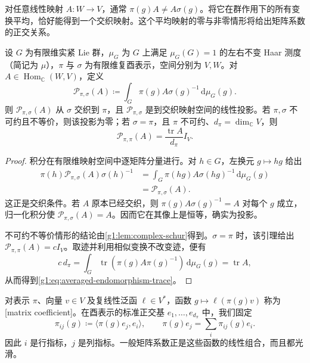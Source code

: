 \ProseParagraphBreak

对任意线性映射 \(A:W\to V\)，通常 \(\pi(g)A\ne A\sigma(g)\)。将它在群作用下的所有变换平均，恰好能得到一个交织映射。这个平均映射的零与非零情形将给出矩阵系数的正交关系。

\begin{proposition}\label{g1:prop:averaged-intertwiner}
	设 \(G\) 为有限维实紧 Lie 群，\(\mu_G\) 为 \(G\) 上满足 \(\mu_G(G)=1\) 的左右不变 Haar 测度（简记为 \(\mu\)），\(\pi\) 与 \(\sigma\) 为有限维复酉表示，空间分别为 \(V,W\)。对 \(A\in\operatorname{Hom}_{\mathbb C}(W,V)\)，定义
	\[
		\mathcal P_{\pi,\sigma}(A)
		\coloneqq\int_G\pi(g)A\sigma(g)^{-1}\,\mathrm{d}\mu_G(g).
	\]
	则 \(\mathcal P_{\pi,\sigma}(A)\) 从 \(\sigma\) 交织到 \(\pi\)，且 \(\mathcal P_{\pi,\sigma}\) 是到交织映射空间的线性投影。若 \(\pi,\sigma\) 不可约且不等价，则该投影为零；若 \(\sigma=\pi\)，且 \(\pi\) 不可约、\(d_\pi=\dim_{\mathbb C}V\)，则
	\begin{equation}\label{g1:eq:averaged-endomorphism-trace}
		\mathcal P_{\pi,\pi}(A)=\frac{\operatorname{tr}A}{d_\pi}I_V.
	\end{equation}
\end{proposition}
\begin{proof}
	积分在有限维映射空间中逐矩阵分量进行。对 \(h\in G\)，左换元 \(g\mapsto hg\) 给出
	\[
		\begin{aligned}
			\pi(h)\mathcal P_{\pi,\sigma}(A)\sigma(h)^{-1}
			&=\int_G\pi(hg)A\sigma(hg)^{-1}\,\mathrm{d}\mu_G(g)\\
			&=\mathcal P_{\pi,\sigma}(A).
		\end{aligned}
	\]
	这正是交织条件。若 \(A\) 原本已经交织，则 \(\pi(g)A\sigma(g)^{-1}=A\) 对每个 \(g\) 成立，归一化积分使 \(\mathcal P_{\pi,\sigma}(A)=A\)。因而它在其像上是恒等，确实为投影。

	不可约不等价情形的结论由\cref{g1:lem:complex-schur}得到。\(\sigma=\pi\) 时，该引理给出 \(\mathcal P_{\pi,\pi}(A)=cI_V\)。取迹并利用相似变换不改变迹，便有
	\[
		c\,d_\pi=\int_G\operatorname{tr}(\pi(g)A\pi(g)^{-1})\,\mathrm{d}\mu_G(g)
		=\operatorname{tr}A,
	\]
	从而得到\eqref{g1:eq:averaged-endomorphism-trace}。
\end{proof}

对表示 \(\pi\)、向量 \(v\in V\) 及复线性泛函 \(\ell\in V^*\)，函数 \(g\mapsto\ell(\pi(g)v)\) 称为[matrix coefficient]。在酉表示的标准正交基 \(e_1,\ldots,e_{d_\pi}\) 中，我们固定
\begin{equation}\label{g1:eq:matrix-coefficient-convention}
	\pi_{ij}(g)\coloneqq\langle\pi(g)e_j,e_i\rangle,
	\qquad
	\pi(g)e_j=\sum_i\pi_{ij}(g)e_i.
\end{equation}
因此 \(i\) 是行指标，\(j\) 是列指标。一般矩阵系数正是这些函数的线性组合，而且都光滑。

